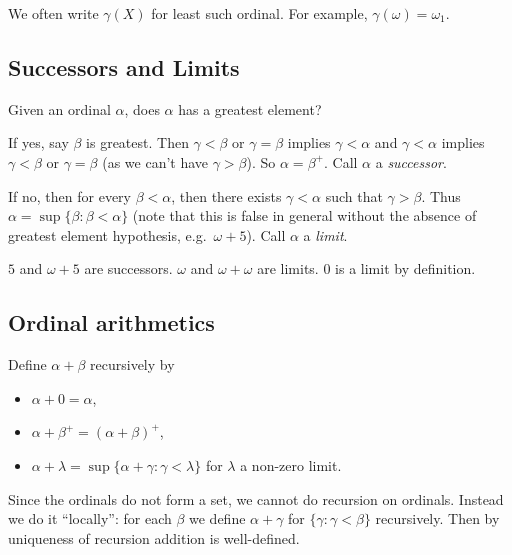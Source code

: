 \documentclass[a4paper]{article}
\begin{document}
\begin{notation}
  We often write \(\gamma(X)\) for least such ordinal. For example, \(\gamma(\omega) = \omega_1\).
\end{notation}

\subsection{Successors and Limits}

Given an ordinal \(\alpha\), does \(\alpha\) has a greatest element?

If yes, say \(\beta\) is greatest. Then \(\gamma < \beta\) or \(\gamma = \beta\) implies \(\gamma < \alpha\) and \(\gamma < \alpha\) implies \(\gamma < \beta\) or \(\gamma = \beta\) (as we can't have \(\gamma > \beta\)). So \(\alpha = \beta^+\). Call \(\alpha\) a \emph{successor}.

If no, then for every \(\beta < \alpha\), then there exists \(\gamma < \alpha\) such that \(\gamma > \beta\). Thus \(\alpha = \sup\{\beta: \beta < \alpha\}\) (note that this is false in general without the absence of greatest element hypothesis, e.g.\ \(\omega + 5\)). Call \(\alpha\) a \emph{limit}.

\begin{eg}
  \(5\) and \(\omega + 5\) are successors. \(\omega\) and \(\omega + \omega\) are limits. \(0\) is a limit by definition.
\end{eg}

\subsection{Ordinal arithmetics}

\begin{definition}
  Define \(\alpha + \beta\) recursively by
  \begin{itemize}
  \item \(\alpha + 0 = \alpha\),
  \item \(\alpha + \beta^+ = (\alpha + \beta)^+\),
  \item \(\alpha + \lambda = \sup \{\alpha + \gamma: \gamma < \lambda\}\) for \(\lambda\) a non-zero limit.
  \end{itemize}
\end{definition}

Since the ordinals do not form a set, we cannot do recursion on ordinals. Instead we do it ``locally'': for each \(\beta\) we define \(\alpha + \gamma\) for \(\{\gamma: \gamma < \beta\}\) recursively. Then by uniqueness of recursion addition is well-defined.
\end{document}
